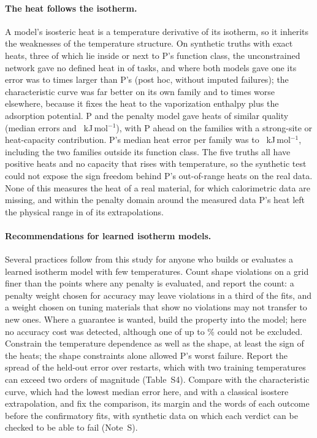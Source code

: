 \documentclass[journal=jcisd8,manuscript=article]{achemso}
\begin{document}
\paragraph{The heat follows the isotherm.} A model's isosteric heat is a temperature derivative of its isotherm, so
it inherits the weaknesses of the temperature structure. On synthetic truths with exact heats, three of which lie
inside or next to P's function class, the unconstrained network gave no defined heat in  of
 tasks, and where both models gave one its error was  to
 times larger than P's (post hoc, without imputed failures); the characteristic curve was far better
on its own family and  to  times worse elsewhere, because it fixes the heat to the vaporization enthalpy plus the adsorption potential. P and the penalty
model gave heats of similar quality (median errors  and ~kJ\,mol$^{-1}$), with P
ahead on the families with a strong-site or heat-capacity contribution. P's median heat error per family was
 to ~kJ\,mol$^{-1}$, including the two families outside its function class.
The five truths all have positive heats and no capacity that rises with temperature, so the synthetic test could
not expose the sign freedom behind P's out-of-range heats on the real data. None of this measures the heat of a real
material, for which calorimetric data are missing, and within the penalty
domain around the measured data P's heat left the physical range in  of its 
extrapolations.

\paragraph{Recommendations for learned isotherm models.} Several practices follow from this study for anyone who
builds or evaluates a learned isotherm model with few temperatures. Count shape violations on a grid finer than the
points where any penalty is evaluated, and report the count: a penalty weight chosen for accuracy may leave
violations in a third of the fits, and a weight chosen on tuning materials that show no violations may not transfer
to new ones. Where a guarantee is wanted, build the property into the model; here no accuracy cost was detected,
although one of up to \% could not be excluded. Constrain the temperature dependence as well as
the shape, at least the sign of the heats; the shape constraints alone allowed P's worst failure. Report the spread of
the held-out error over restarts, which with two training temperatures can exceed two orders of magnitude
(Table~S4). Compare with the characteristic curve, which had the lowest median error here, and with a classical
isostere extrapolation, and fix the comparison, its margin and the words of each outcome before the confirmatory
fits, with synthetic data on which each verdict can be checked to be able to fail (Note~S).
\end{document}

